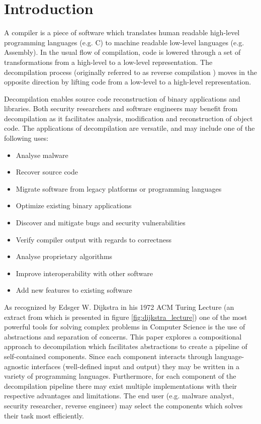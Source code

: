 
\section{Introduction}
\label{sec:introduction}

A compiler is a piece of software which translates human readable high-level programming languages (e.g. C) to machine readable low-level languages (e.g. Assembly). In the usual flow of compilation, code is lowered through a set of transformations from a high-level to a low-level representation. The decompilation process (originally referred to as reverse compilation \cite{reverse_comp}) moves in the opposite direction by lifting code from a low-level to a high-level representation.

Decompilation enables source code reconstruction of binary applications and libraries. Both security researchers and software engineers may benefit from decompilation as it facilitates analysis, modification and reconstruction of object code. The applications of decompilation are versatile, and may include one of the following uses:

\begin{itemize}
	\item Analyse malware
	\item Recover source code
	\item Migrate software from legacy platforms or programming languages
	\item Optimize existing binary applications
	\item Discover and mitigate bugs and security vulnerabilities
	\item Verify compiler output with regards to correctness
	\item Analyse proprietary algorithms
	\item Improve interoperability with other software
	\item Add new features to existing software
\end{itemize}

As recognized by Edsger W. Dijkstra in his 1972 ACM Turing Lecture (an extract from which is presented in figure \ref{fig:dijkstra_lecture}) one of the most powerful tools for solving complex problems in Computer Science is the use of abstractions and separation of concerns. This paper explores a compositional approach to decompilation which facilitates abstractions to create a pipeline of self-contained components. Since each component interacts through language-agnostic interfaces (well-defined input and output) they may be written in a variety of programming languages. Furthermore, for each component of the decompilation pipeline there may exist multiple implementations with their respective advantages and limitations. The end user (e.g. malware analyst, security researcher, reverse engineer) may select the components which solves their task most efficiently.

